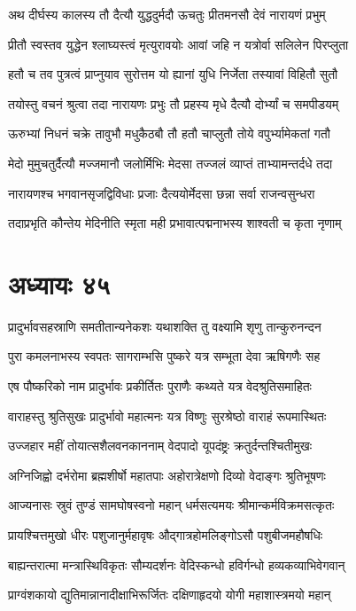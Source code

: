 \twolineshloka
{अथ दीर्घस्य कालस्य तौ दैत्यौ युद्धदुर्मदौ}
{ऊचतुः प्रीतमनसौ देवं नारायणं प्रभुम्}


\twolineshloka
{प्रीतौ स्वस्तव युद्धेन श्लाघ्यस्त्वं मृत्युरावयोः}
{आवां जहि न यत्रोर्वा सलिलेन पिरप्लुता}


\twolineshloka
{हतौ च तव पुत्रत्वं प्राप्नुयाव सुरोत्तम}
{यो ह्यानां युधि निर्जेता तस्यावां विहितौ सुतौ}


\twolineshloka
{तयोस्तु वचनं श्रुत्वा तदा नारायणः प्रभुः}
{तौ प्रहस्य मृधे दैत्यौ दोर्भ्यां च समपीडयम्}


\twolineshloka
{ऊरुभ्यां निधनं चक्रे तावुभौ मधुकैठबौ}
{तौ हतौ चाप्लुतौ तोये वपुर्भ्यामेकतां गतौ}


\twolineshloka
{मेदो मुमुचतुर्दैत्यौ मज्जमानौ जलोर्मिभिः}
{मेदसा तज्जलं व्याप्तं ताभ्यामन्तर्दधे तदा}


\twolineshloka
{नारायणश्च भगवानसृजद्विविधाः प्रजाः}
{दैत्ययोर्मेदसा छन्ना सर्वा राजन्वसुन्धरा}


\twolineshloka
{तदाप्रभृति कौन्तेय मेदिनीति स्मृता मही}
{प्रभावात्पद्मनाभस्य शाश्वती च कृता नृणाम्}


\chapter{अध्यायः ४५}
\twolineshloka
{प्रादुर्भावसहस्राणि समतीतान्यनेकशः}
{यथाशक्ति तु वक्ष्यामि शृणु तान्कुरुनन्दन}


\twolineshloka
{पुरा कमलनाभस्य स्वपतः सागराम्भसि}
{पुष्करे यत्र सम्भूता देवा ऋषिगणैः सह}


\twolineshloka
{एष पौष्करिको नाम प्रादुर्भावः प्रकीर्तितः}
{पुराणैः कथ्यते यत्र वेदश्रुतिसमाहितः}


\twolineshloka
{वाराहस्तु श्रुतिसुखः प्रादुर्भावो महात्मनः}
{यत्र विष्णुः सुरश्रेष्ठो वाराहं रूपमास्थितः}


\twolineshloka
{उज्जहार महीं तोयात्सशैलवनकाननाम्}
{वेदपादो यूपदंष्ट्रः क्रतुर्दन्तश्चितीमुखः}


\twolineshloka
{अग्निजिह्वो दर्भरोमा ब्रह्मशीर्षो महातपाः}
{अहोरात्रेक्षणो दिव्यो वेदाङ्गः श्रुतिभूषणः}


\twolineshloka
{आज्यनासः स्रुवं तुण्डं सामघोषस्वनो महान्}
{धर्मसत्यमयः श्रीमान्कर्मविक्रमसत्कृतः}


\twolineshloka
{प्रायश्चित्तमुखो धीरः पशुजानुर्महावृषः}
{औद्गात्रहोमलिङ्गोऽसौ पशुबीजमहौषधिः}


\twolineshloka
{बाह्यन्तरात्मा मन्त्रास्थिविकृतः सौम्यदर्शनः}
{वेदिस्कन्धो हविर्गन्धो हव्यकव्याभिवेगवान्}


\twolineshloka
{प्राग्वंशकायो द्युतिमान्नानादीक्षाभिरूर्जितः}
{दक्षिणाहृदयो योगी महाशास्त्रमयो महान्}


